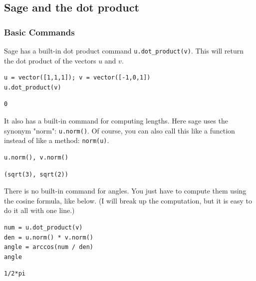 \documentclass[10pt,]{book}
\theoremstyle{plain}
\numberwithin{equation}{section}
\begin{document}
\subsection[Sage and the dot product]{Sage and the dot product}\label{subsection-8}
\typeout{************************************************}
\typeout{************************************************}
\subsubsection[Basic Commands]{Basic Commands}\label{subsubsection-2}

      Sage has a built-in dot product command \verb?u.dot_product(v)?. This
      will return the dot product of the vectors \(u\) and \(v\).
\begin{lstlisting}[style=sageinput]
u = vector([1,1,1]); v = vector([-1,0,1])
u.dot_product(v)
\end{lstlisting}
\begin{lstlisting}[style=sageoutput]
0
\end{lstlisting}
\par

      It also has a built-in command for computing lengths. Here sage uses the
      synonym "norm": \verb?u.norm()?. Of course, you can also call this like
      a function instead of like a method: \verb?norm(u)?.
\begin{lstlisting}[style=sageinput]
u.norm(), v.norm()
\end{lstlisting}
\begin{lstlisting}[style=sageoutput]
(sqrt(3), sqrt(2))
\end{lstlisting}
\par

      There is no built-in command for angles. You just have to compute them
      using the cosine formula, like below. (I will break up the computation,
      but it is easy to do it all with one line.)
\begin{lstlisting}[style=sageinput]
num = u.dot_product(v)
den = u.norm() * v.norm()
angle = arccos(num / den)
angle
\end{lstlisting}
\begin{lstlisting}[style=sageoutput]
1/2*pi
\end{lstlisting}
\par
\end{document}
